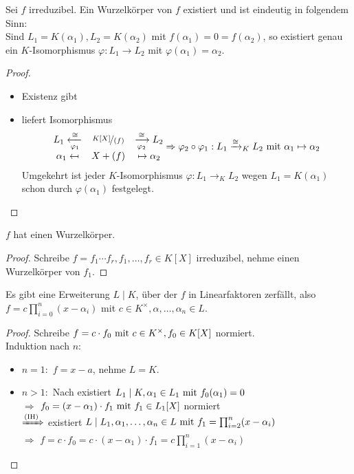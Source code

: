 \begin{proposition}
	Sei $f$ irreduzibel. Ein Wurzelkörper von $f$ existiert und ist eindeutig in folgendem Sinn:\\
	Sind $L_1 = K(\alpha_1), L_2 = K(\alpha_2)$ mit $f(\alpha_1) = 0 = f(\alpha_2)$, so existiert genau ein $K$-Isomorphismus $\varphi: L_1 \to L_2$ mit $\varphi(\alpha_1) = \alpha_2$.
\end{proposition}
\begin{proof}
	\begin{itemize}
		\item Existenz gibt 
		\item {} liefert Isomorphismus
		\begin{align*}
			\begin{matrix}
				L_1 \xleftarrow[\varphi_1]{\cong} & \lnkset{K[X]}{(f)} & \xrightarrow[\varphi_2]{\cong} L_2\\
				\alpha_1 \mapsfrom & X + (f) & \mapsto \alpha_2\\
			\end{matrix}
			\Rightarrow \varphi_2 \circ \varphi_1 : L_1 \xrightarrow{\cong}_K L_2 \mit \alpha_1 \mapsto \alpha_2
		\end{align*}
		Umgekehrt ist jeder $K$-Isomorphismus $\varphi: L_1 \to_K L_2$ wegen $L_1 = K(\alpha_1)$ schon durch $\varphi(\alpha_1)$ festgelegt.
	\end{itemize}
\end{proof}
\begin{conclusion}
	$f$ hat einen Wurzelkörper.
\end{conclusion}
\begin{proof}
	Schreibe $f=f_1\cdots f_r, f_1,\dots,f_r \in K[X]$ irreduzibel, nehme einen Wurzelkörper von $f_1$.
\end{proof}
\begin{conclusion}
	Es gibt eine Erweiterung $L\mid K$, über der $f$ in Linearfaktoren zerfällt, also $f=c\prod_{i=0}^{n}(x-\alpha_i)$ mit $c \in K^{\times}, \alpha,\dots,\alpha_n \in L$. 
\end{conclusion}
\begin{proof}
	Schreibe $f=c\cdot f_0 \mit c \in K^{\times}, f_0 \in K[X]$ normiert.\\ Induktion nach $n$:
	\begin{itemize}
		\item $n=1:$ $f = x-a$, nehme $L=K$.
		\item $n>1:$ Nach  existiert $L_1 \mid K, \alpha_1 \in L_1 \mit f_0 (\alpha_1) = 0$\\
		$\Rightarrow$ $f_0 = (x-\alpha_1)\cdot f_1 \mit f_1 \in L_1 [X]$ normiert\\
		$\xRightarrow{\text{(IH)}}$ existiert $L\mid L_1 , \alpha_1, \dots, \alpha_n \in L \mit f_1 = \prod_{i=2}^n (x - \alpha_i)$\\
		$\Rightarrow$ $f = c\cdot f_0 = c\cdot (x-\alpha_1) \cdot f_1 = c \prod_{i=1}^n (x- \alpha_i)$
	\end{itemize}
\end{proof}

